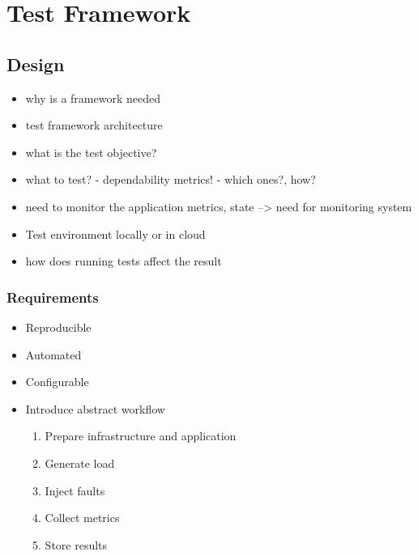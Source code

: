 \chapter{Test Framework}

\section{Design}

\begin{itemize}
	\item why is a framework needed
	\item test framework architecture
	\item what is the test objective?
	\item what to test? - dependability metrics! - which ones?, how?
	\item need to monitor the application metrics, state --> need for monitoring system
	\item Test environment locally or in cloud
	\item how does running tests affect the result
\end{itemize}

\subsection{Requirements}

\begin{itemize}
	\item Reproducible
	\item Automated
	\item Configurable
	\item Introduce abstract workflow \begin{enumerate}
		\item Prepare infrastructure and application
		\item Generate load
		\item Inject faults
		\item Collect metrics
		\item Store results
	\end{enumerate}
\end{itemize}

